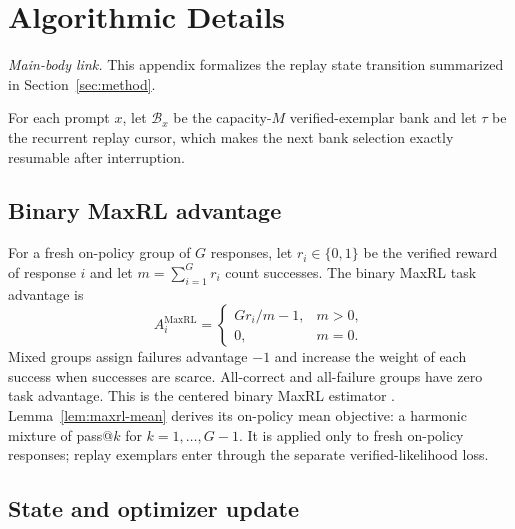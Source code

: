 \clearpage
\section{Algorithmic Details}
\label{app:algorithm}

\noindent\emph{Main-body link.} This appendix formalizes the replay state
transition summarized in Section~\ref{sec:method}.

For each prompt $x$, let $\mathcal B_x$ be the capacity-$M$ verified-exemplar
bank and let $\tau$ be the recurrent replay cursor, which makes the next
bank selection exactly resumable after interruption.

\subsection{Binary MaxRL advantage}
\label{app:binary-maxrl}

For a fresh on-policy group of $G$ responses, let $r_i\in\{0,1\}$ be the
verified reward of response $i$ and let $m=\sum_{i=1}^G r_i$ count successes.
The binary MaxRL task advantage is
\[
  A_i^{\mathrm{MaxRL}}=
  \begin{cases}
    G r_i/m-1, & m>0,\\
    0, & m=0.
  \end{cases}
\]
Mixed groups assign failures advantage $-1$ and increase the weight of each
success when successes are scarce. All-correct and all-failure groups have
zero task advantage. This is the centered binary MaxRL estimator
\citep{tajwar2026maxrl}. Lemma~\ref{lem:maxrl-mean} derives its on-policy
mean objective: a harmonic mixture of pass@\(k\) for $k=1,\ldots,G-1$.
It is applied only to fresh on-policy responses;
replay exemplars enter through the separate verified-likelihood loss.

\subsection{State and optimizer update}
\label{app:algorithm-update}

